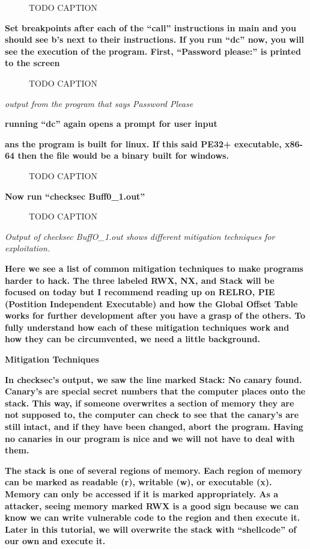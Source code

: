 \documentclass[letterpaper]{article}
\newcommand{\sitfig}[3]{
\begin{figure}[H]
\centering
\makebox[\textwidth][c]{
#2
}
\caption{#3}
\label{#1}
\end{figure}
}
\newcommand{\sitgfx}[4][scale=1.0]{
\sitfig{#3}{\texttt{[image: \#2]}}{#4}
}
\begin{document}
  
\sitgfx[width=5.8335in,height=3.6457in]{FINALWORKINGDOCFORMERLYPRECURSOR-img081.png}{fig:unk}{TODO CAPTION}
 

\textbf{Set breakpoints after each of the ``call'' instructions in main and you should see b's next to their
instructions. If you run ``dc'' now, you will see the execution of the program. First, ``Password please:'' is printed
to the screen}

  
\sitgfx[width=5.8335in,height=3.6457in]{FINALWORKINGDOCFORMERLYPRECURSOR-img082.png}{fig:unk}{TODO CAPTION}
 

\textit{output from the program that says Password Please}

\textbf{running ``dc'' again opens a prompt for user input}

\textbf{ans the program is built for linux. If this said PE32+ executable, x86-64 then the file would be a binary built
for windows.}

  
\sitgfx[width=5.8335in,height=0.9602in]{FINALWORKINGDOCFORMERLYPRECURSOR-img074.png}{fig:unk}{TODO CAPTION}
 

\textbf{Now run ``checksec Buff0\_1.out''}  
\sitgfx[width=5.8335in,height=3.6457in]{FINALWORKINGDOCFORMERLYPRECURSOR-img083.png}{fig:unk}{TODO CAPTION}
 

\textit{Output of checksec BuffO\_1.out shows different mitigation techniques for exploitation.}

\textbf{Here we see a list of common mitigation techniques to make programs harder to hack. The three labeled RWX, NX,
and Stack will be focused on today but I recommend reading up on RELRO, PIE (Postition Independent Executable) and how
the Global Offset Table works for further development after you have a grasp of the others. To fully understand how
each of these mitigation techniques work and how they can be circumvented, we need a little background.}

{\centering
\textbf{Mitigation Techniques}
\par}

\textbf{In checksec's output, we saw the line marked Stack: No canary found. Canary's are special secret numbers that
the computer places onto the stack. This way, if someone overwrites a section of memory they are not supposed to, the
computer can check to see that the canary's are still intact, and if they have been changed, abort the program. Having
no canaries in our program is nice and we will not have to deal with them.}

\textbf{The stack is one of several regions of memory. Each region of memory can be marked as readable (r), writable
(w), or executable (x). Memory can only be accessed if it is marked appropriately. As a attacker, seeing memory marked
RWX is a good sign because we can know we can write vulnerable code to the region and then execute it. Later in this
tutorial, we will overwrite the stack with ``shellcode'' of our own and execute it.}
\end{document}
